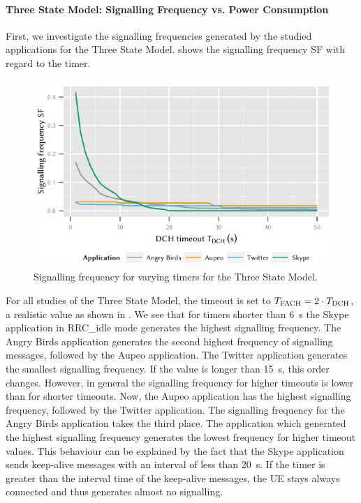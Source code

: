 \paragraph*{Three State Model: Signalling Frequency vs. Power Consumption}\label{sec:network:network_traces:numerical_results:three_states}
First, we investigate the signalling frequencies generated by the studied applications for the Three State Model.
 shows the signalling frequency \gls{SF} with regard to the \TDCH timer.
\begin{figure}
	\centering
	\includegraphics{network/network_traces/numerical_results/figures/3_state_tdch_vs_frequency}
	\caption{Signalling frequency  for varying \TDCH timers for the Three State Model.}\label{fig:network:network_traces:numerical_results:three_states:three_states:signalling}
\end{figure}
For all studies of the Three State Model, the \TFACH timeout is set to \(T_{\text{FACH}} = 2\cdot  T_{\text{DCH}}\), a realistic value as shown in \cite{Qian2011a}.
We see that for \TDCH timers shorter than \SI{6}{\second} the Skype application in \gls{RRC_idle} mode generates the highest signalling frequency.
The Angry Birds application generates the second highest frequency of signalling messages, followed by the Aupeo application.
The Twitter application generates the smallest signalling frequency.
If the \TDCH value is longer than \SI{15}{\second}, this order changes.
However, in general the signalling frequency for higher \TDCH timeouts is lower than for shorter \TDCH timeouts.
Now, the Aupeo application has the highest signalling frequency, followed by the Twitter application.
The signalling frequency for the Angry Birds application takes the third place.
The application which generated the highest signalling frequency generates the lowest frequency for higher timeout values.
This behaviour can be explained by the fact that the Skype application sends keep-alive messages with an interval of less than \SI{20}{\second}.
If the timer is greater than the interval time of the keep-alive messages, the \gls{UE} stays always connected and thus generates almost no signalling.

